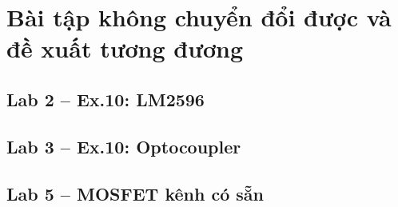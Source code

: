 \section{Bài tập không chuyển đổi được và đề xuất tương đương}
\subsection*{Lab 2 -- Ex.10: LM2596}
\begin{fillbox}\todo{}\end{fillbox}
\subsection*{Lab 3 -- Ex.10: Optocoupler}
\begin{fillbox}\todo{}\end{fillbox}
\subsection*{Lab 5 -- MOSFET kênh có sẵn}
\begin{fillbox}\todo{}\end{fillbox}
